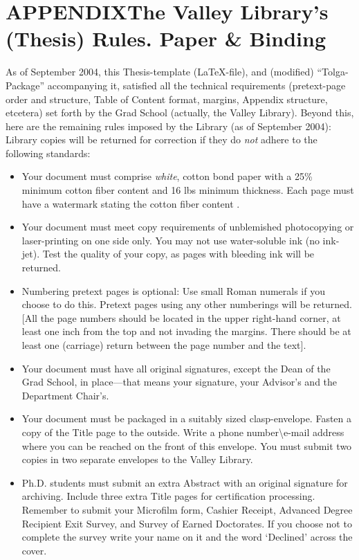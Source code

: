 \documentclass[11pt]{gthesis2}  %
\begin{document}
\section{APPENDIX\;\;\;The Valley Library's (Thesis) Rules. Paper \& Binding}
\label{sec:Library Rules}
%
%
\indent As of September 2004, this Thesis-template (\LaTeX -file),
and (modified) ``Tolga-Package'' accompanying it, satisfied all
the technical requirements (pretext-page order and structure,
Table of Content format, margins, Appendix structure, etcetera)
set forth by the Grad School (actually, the Valley Library).
Beyond this, here are the remaining rules imposed by the Library
(as of September 2004): Library copies will be returned for
correction if they do \emph{not} adhere to the following
standards:
%
\begin{itemize}
    \item  Your document must comprise \emph{white}, cotton bond
    paper with a 25\% minimum cotton fiber content and 16 lbs
    minimum thickness. Each page
    must have a watermark stating the cotton fiber content .
    \item  Your document must meet copy requirements of unblemished
    photocopying or
    laser-printing on one side only. You may not use
    water-soluble ink (no ink-jet). Test the
    quality of your copy, as pages with bleeding ink will be returned.
   \item  Numbering pretext pages is
    optional: Use small Roman numerals if you choose to do this.
    Pretext pages using any other numberings
    will be returned.
    [All the page numbers should be located in the upper right-hand
    corner, at least one inch from the top and not invading
    the margins. There should be at least one (carriage) return
    between the page number and the text].
    \item  Your document must have all original signatures, except
    the Dean of the Grad School, in place---that means your signature,
    your Advisor's
    and the Department Chair's.
    \item Your document must be packaged in a suitably sized
    clasp-envelope. Fasten a copy of the Title page to the
    outside. Write a phone number\textbackslash e-mail address
    where you can be reached on the front of this envelope. You
    must submit two copies in two separate envelopes to the
    Valley Library.
    \item  Ph.D. students must submit an extra Abstract with an original
    signature for archiving. Include three extra Title pages for
    certification processing. Remember to submit your Microfilm
    form, Cashier Receipt, Advanced Degree Recipient Exit Survey,
    and Survey of Earned Doctorates. If you choose not to
    complete the survey write your name on it and the word
    `Declined' across the cover.
\end{itemize}
\end{document}
